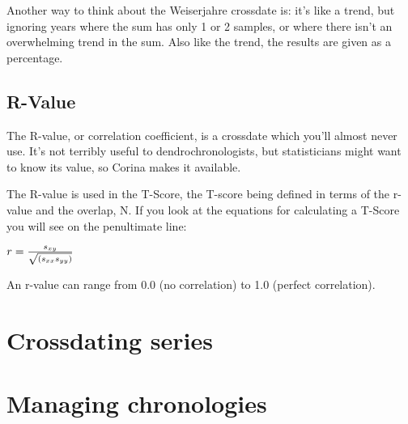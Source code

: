 Another way to think about the Weiserjahre crossdate is: it's like a trend, but ignoring years where the sum has only 1 or 2 samples, or where there isn't an overwhelming trend in the sum. Also like the trend, the results are given as a percentage.


\subsection{R-Value}
The R-value, or correlation coefficient, is a crossdate which you'll almost never use. It's not terribly useful to dendrochronologists, but statisticians might want to know its value, so Corina makes it available.

The R-value is used in the T-Score, the T-score being defined in terms of the r-value and the overlap, N. If you look at the equations for calculating a T-Score you will see on the penultimate line: 

\begin{itemize*}
 \item $r = {s_{xy} \over \sqrt{(s_{xx} s_{yy})}}$
\end{itemize*}

An r-value can range from 0.0 (no correlation) to 1.0 (perfect correlation). 
 

\section{Crossdating series}

\section{Managing chronologies}

